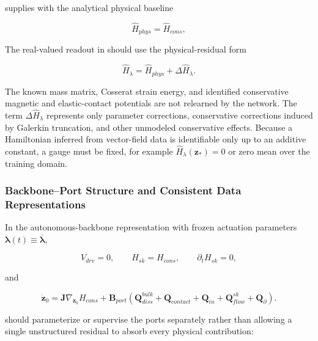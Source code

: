  supplies  with the analytical physical baseline

\begin{equation}
\label{eq:hamiltonian-3-69}
{\widehat{H}}_{phys} = {\widehat{H}}_{cons},
\end{equation}

The real-valued readout in  should use the physical-residual form

\begin{equation}
\label{eq:hamiltonian-3-70}
\boxed{{\widehat{H}}_{\lambda} = {\widehat{H}}_{phys} + \Delta{\widehat{H}}_{\lambda}.}
\end{equation}

The known mass matrix, Cosserat strain energy, and identified conservative magnetic and elastic-contact potentials are not relearned by the network. The term \(\Delta{\widehat{H}}_{\lambda}\) represents only parameter corrections, conservative corrections induced by Galerkin truncation, and other unmodeled conservative effects. Because a Hamiltonian inferred from vector-field data is identifiable only up to an additive constant, a gauge must be fixed, for example \({\widehat{H}}_{\lambda}\left( \mathbf{z}_{*} \right) = 0\) or zero mean over the training domain.\cite{Greydanus2019HNN,Desai2021PHNN}

\subsubsection{Backbone--Port Structure and Consistent Data Representations}\label{sec:hamiltonian-3-7-2}

In the autonomous-backbone representation with frozen actuation parameters \(\bm{\lambda}(t) \equiv \overline{\bm{\lambda}}\),

\begin{equation}
\label{eq:hamiltonian-3-71}
V_{drv} = 0,\quad\quad H_{sk} = H_{cons},\quad\quad\partial_{t}H_{sk} = 0,
\end{equation}

and

\begin{equation}
\label{eq:hamiltonian-3-72}
\boxed{{\dot{\mathbf{z}}}_{0} = \mathbf{J}\nabla_{\mathbf{z}_{0}}H_{cons} + \mathbf{B}_{port}\left( \mathbf{Q}_{diss}^{bulk} + \mathbf{Q}_{contact} + \mathbf{Q}_{in} + \mathbf{Q}_{flow}^{sk} + \mathbf{Q}_{\partial} \right).}
\end{equation}

 should parameterize or supervise the ports separately rather than allowing a single unstructured residual to absorb every physical contribution:

